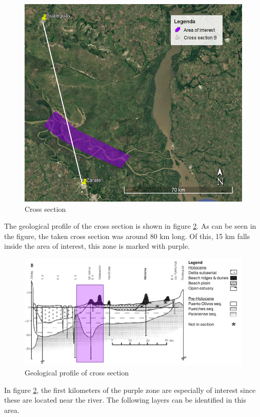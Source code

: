 \begin{figure}[H]
    \centering
    \includegraphics[width=0.75\linewidth]{figures/ch9/CrossSectionB.png}
    \caption{Cross section}
    \label{fig:crosssectiongeo}
\end{figure}

The geological profile of the cross section is shown in figure \ref{fig:geolprofile}. As can be seen in the figure, the taken cross section was around 80 km long. Of this, 15 km falls inside the area of interest, this zone is marked with purple.

\begin{figure}[H]
    \centering
    \includegraphics[width=1\linewidth]{figures/ch9/CrossSectionBResults.png}
    \caption{Geological profile of cross section \autocite{joseluiscavallottoEvolucionCambiosAmbientales2005}}
    \label{fig:geolprofile}
\end{figure}

In figure \ref{fig:geolprofile}, the first kilometers of the purple zone are especially of interest since these are located near the river. The following layers can be identified in this area.

